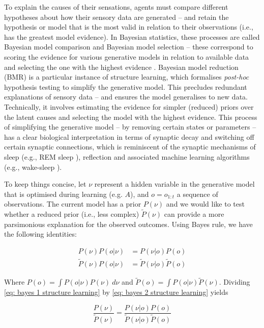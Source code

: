 \documentclass{article}
\begin{document}
To explain the causes of their sensations, agents must compare different hypotheses about how their sensory data are generated – and retain the hypothesis or model that is the most valid in relation to their observations (i.e., has the greatest model evidence). In Bayesian statistics, these processes are called Bayesian model comparison and Bayesian model selection -- these correspond to scoring the evidence for various generative models in relation to available data and selecting the one with the highest evidence \cite{claeskensModelSelectionModel2006,stephanBayesianModelSelection2009}.
Bayesian model reduction (BMR) is a particular instance of structure learning, which formalises \textit{post-hoc} hypothesis testing to simplify the generative model. This precludes redundant explanations of sensory data – and ensures the model generalises to new data. Technically, it involves estimating the evidence for simpler (reduced) priors over the latent causes and selecting the model with the highest evidence. This process of simplifying the generative model -- by removing certain states or parameters -- has a clear biological interpretation in terms of synaptic decay and switching off certain synaptic connections, which is reminiscent of the synaptic mechanisms of sleep (e.g., REM sleep \cite{hobsonWakingDreamingConsciousness2012,hobsonVirtualRealityConsciousness2014}), reflection and associated machine learning algorithms (e.g., wake-sleep \cite{hintonWakesleepAlgorithmUnsupervised1995}).

To keep things concise, let $\nu$ represent a hidden variable in the generative model that is optimised during learning (e.g. $A$), and $o=o_{1:t}$ a sequence of observations. The current model has a prior $P(\nu)$ and we would like to test whether a reduced prior (i.e., less complex) $\tilde P(\nu)$ can provide a more parsimonious explanation for the observed outcomes. Using Bayes rule, we have the following identities:

\begin{align}
P(\nu)P(o|\nu)&= P(\nu |o)P(o) \label{eq: bayes 1 structure learning}\\ 
\tilde P(\nu)P(o|\nu)&= \tilde P(\nu |o)\tilde P(o) \label{eq: bayes 2 structure learning}
\end{align}

Where $P(o)=\int P(o|\nu)P(\nu) \: d\nu$ and $\tilde P(o)=\int P(o|\nu) \tilde P(\nu)$. Dividing \eqref{eq: bayes 1 structure learning} by \eqref{eq: bayes 2 structure learning} yields
	 
	 \begin{equation}
\label{eq: bayes divided}
	     \frac{P(\nu)}{\tilde P(\nu)} = \frac{P(\nu|o)P(o)}{\tilde P(\nu|o)\tilde P(o)} 
	 \end{equation}
  	
\end{document}
